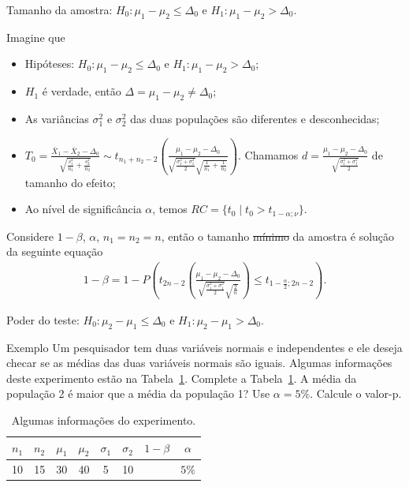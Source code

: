 \documentclass[9pt]{beamer}
\begin{document}
\begin{frame}{Tamanho da amostra: $H_0:\mu_1 - \mu_2 \leq \Delta_0$ e $H_1: \mu_1 - \mu_2 > \Delta_0$.}

\footnotesize

Imagine que
\begin{itemize}
	\item Hipóteses: $H_0: \mu_1 - \mu_2 \leq \Delta_0$ e $H_1: \mu_1 -  \mu_2 > \Delta_0$;
	\item $H_1$ é verdade, então $\Delta = \mu_1-\mu_2 \neq \Delta_0$;
	\item As variâncias $\sigma_1^2$  e $\sigma_2^2$ das duas populações são diferentes e desconhecidas;
	\item $T_0 = \frac{\bar{X}_1 - \bar{X}_2 - \Delta_0}{ \sqrt{ \frac{s_1^2}{n_1} + \frac{s_2^2}{n_2} } } \sim t_{n_1+n_2-2}\left( \frac{\mu_1 - \mu_2 - \Delta_0}{\sqrt{\frac{\sigma_1^2 + \sigma_1^2}{2}} \sqrt{\frac{1}{n_1} + \frac{1}{n_2}}} \right)$. Chamamos $d = \frac{\mu_1 - \mu_2 - \Delta_0}{\sqrt{\frac{\sigma_1^2 + \sigma_1^2}{2}}}$ de tamanho do efeito;
	\item Ao nível de significância $\alpha$, temos $RC = \{ t_0 \mid t_0 > t_{1-\alpha;\nu} \}$.
\end{itemize}
\vfill

Considere $1-\beta$, $\alpha$, $n_1=n_2=n$, então o tamanho \sout{mínimo} da amostra é solução da seguinte equação
\scriptsize
\begin{align*}
1-\beta = 1 - P\left( t_{2n-2}\left( \frac{ \mu_1 - \mu_2 - \Delta_0 }{\sqrt{\frac{\sigma_1^2 + \sigma_1^2}{2}} \sqrt{\frac{2}{n}}} \right) \leq t_{1-\frac{\alpha}{2};2n-2} \right).
\end{align*}

\normalsize
\end{frame}

\begin{frame}{Poder do teste: $H_0: \mu_2 - \mu_1 \leq \Delta_0$ e $H_1: \mu_2 - \mu_1 > \Delta_0.$}

\begin{block}{Exemplo}
	Um pesquisador tem duas variáveis normais e independentes e ele deseja checar se as médias das duas variáveis normais são iguais. Algumas informações deste experimento estão na Tabela~\ref{tab:experimento-h1-upper-power}. Complete a Tabela~\ref{tab:experimento-h1-upper-power}. A média da população 2 é maior que a média da população 1? Use $\alpha=5\%$. Calcule o valor-p.
\end{block}

\begin{table}[htbp]
	\centering
	\begin{tabular}{c|c|c|c|c|c|c|c}
		\toprule[0.05cm]
		$n_1$ & $n_2$ & $\mu_1$ & $\mu_2$ & $\sigma_1$ & $\sigma_2$ & $1-\beta$ & $\alpha$ \\ \midrule[0.025cm]
		 10 & 15 & 30 & 40 & 5  & 10 & & $5\%$ \\
		 \bottomrule[0.05cm]
	\end{tabular}
	\caption{Algumas informações do experimento.}
	\label{tab:experimento-h1-upper-power}
\end{table}
\end{frame}
\end{document}
